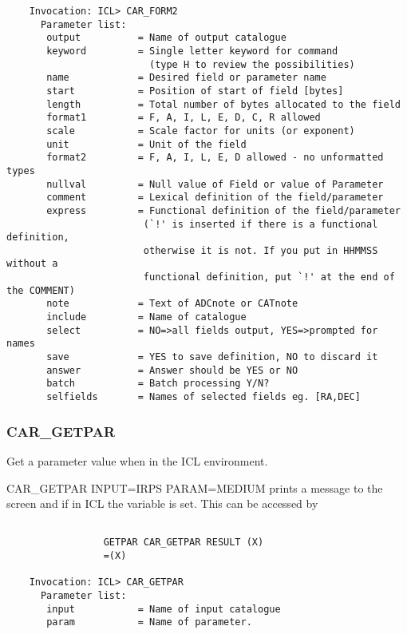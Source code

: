 \begin{verbatim}
    Invocation: ICL> CAR_FORM2
      Parameter list:
       output          = Name of output catalogue
       keyword         = Single letter keyword for command
                         (type H to review the possibilities)
       name            = Desired field or parameter name
       start           = Position of start of field [bytes]
       length          = Total number of bytes allocated to the field
       format1         = F, A, I, L, E, D, C, R allowed
       scale           = Scale factor for units (or exponent)
       unit            = Unit of the field
       format2         = F, A, I, L, E, D allowed - no unformatted types
       nullval         = Null value of Field or value of Parameter
       comment         = Lexical definition of the field/parameter
       express         = Functional definition of the field/parameter
                        (`!' is inserted if there is a functional definition,
                        otherwise it is not. If you put in HHMMSS without a
                        functional definition, put `!' at the end of the COMMENT)
       note            = Text of ADCnote or CATnote
       include         = Name of catalogue
       select          = NO=>all fields output, YES=>prompted for names
       save            = YES to save definition, NO to discard it
       answer          = Answer should be YES or NO
       batch           = Batch processing Y/N?
       selfields       = Names of selected fields eg. [RA,DEC]
\end{verbatim}

\subsubsection{CAR\_GETPAR}

Get a parameter value when in the ICL environment.

CAR\_GETPAR INPUT=IRPS PARAM=MEDIUM prints a message to the screen and if in ICL
the variable is set. This can be accessed by

\begin{verbatim}

                 GETPAR CAR_GETPAR RESULT (X)
                 =(X)

    Invocation: ICL> CAR_GETPAR
      Parameter list:
       input           = Name of input catalogue
       param           = Name of parameter.

\end{verbatim}

